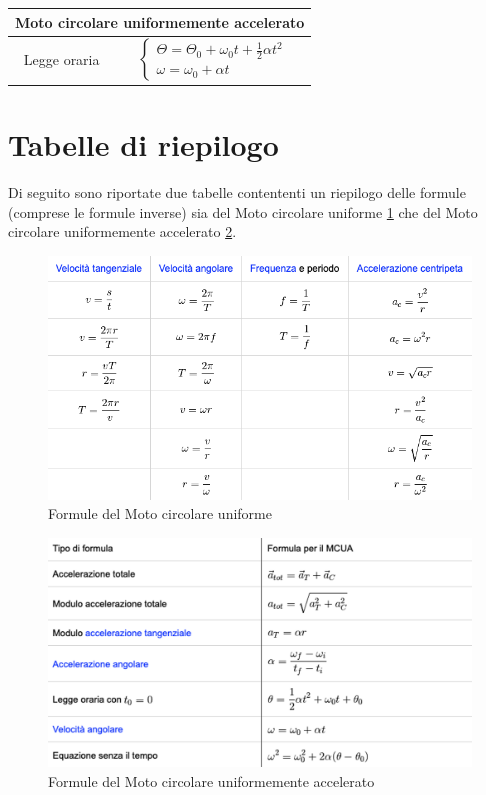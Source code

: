\begin{tabular}{|c|c|}
    \multicolumn{2}{|c|}{Moto circolare uniformemente accelerato} \\

        \hline Legge oraria &
            $
                \begin{cases} 
                    \Theta = \Theta_0 + \omega_0t + \frac{1}{2}\alpha t^2 \\ 
                    \omega = \omega_0+\alpha t
                \end{cases}
            $
            \\
    \hline
\end{tabular}
\endgroup


    \section*{Tabelle di riepilogo} Di seguito sono riportate due 
    tabelle contententi un riepilogo delle formule (comprese le formule 
    inverse) sia del Moto circolare uniforme \ref{fig:MCU} che del Moto 
    circolare uniformemente accelerato \ref{fig:MCUA}.

    \begin{figure}[H]
        \includegraphics[width=0.9\linewidth]
        {formulario/img/Formulario_MCU.png}
        \caption{Formule del Moto circolare uniforme}
        \label{fig:MCU}
    \end{figure}

    \begin{figure}[H]
        \includegraphics[width=0.9\linewidth]
        {formulario/img/Formulario_MCUA.png}
        \caption{Formule del Moto circolare uniformemente accelerato}
        \label{fig:MCUA}
    \end{figure}
